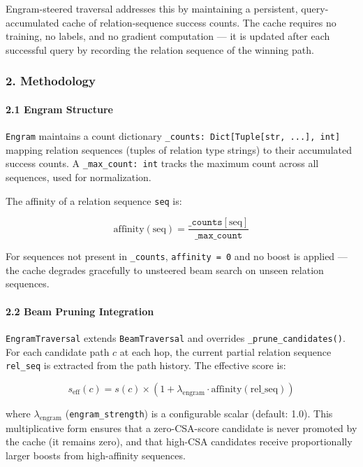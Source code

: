 Engram-steered traversal addresses this by maintaining a persistent, query-accumulated cache of relation-sequence success counts. The cache requires no training, no labels, and no gradient computation — it is updated after each successful query by recording the relation sequence of the winning path.

\subsubsection{2. Methodology}

\paragraph{2.1 Engram Structure}
\texttt{Engram} maintains a count dictionary \texttt{\_counts: Dict[Tuple[str, ...], int]} mapping relation sequences (tuples of relation type strings) to their accumulated success counts. A \texttt{\_max\_count: int} tracks the maximum count across all sequences, used for norma\-lization.

The affinity of a relation sequence \texttt{seq} is:

\begin{equation}
\text{affinity}(\text{seq}) = \frac{\texttt{\_counts}[\text{seq}]}{\texttt{\_max\_count}}
\end{equation}

For sequences not present in \texttt{\_counts}, \texttt{affinity = 0} and no boost is applied — the cache degrades gracefully to unsteered beam search on unseen relation sequences.

\paragraph{2.2 Beam Pruning Integration}
\texttt{EngramTraversal} extends \texttt{BeamTraversal} and overrides \texttt{\_prune\_candidates()}. For each candidate path $c$ at each hop, the current partial relation sequence \texttt{rel\_seq} is extracted from the path history. The effective score is:

\begin{equation}
s_\text{eff}(c) = s(c) \times (1 + \lambda_\text{engram} \cdot \text{affinity}(\text{rel\_seq}))
\end{equation}

where $\lambda_\text{engram}$ (\texttt{engram\_strength}) is a confi\-gurable scalar (default: 1.0). This multi\-plicative form ensures that a zero-CSA-score candidate is never promoted by the cache (it remains zero), and that high-CSA candidates receive propo\-rtionally larger boosts from high-affinity sequences.


